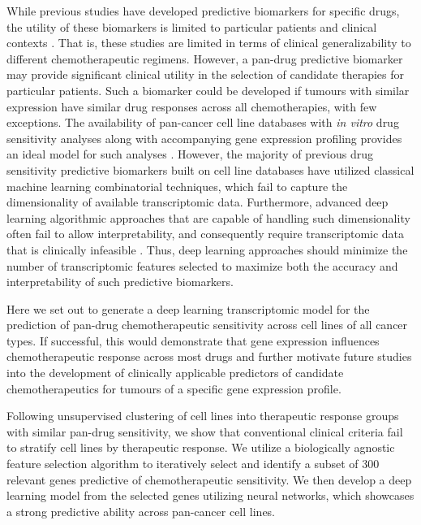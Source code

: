 \documentclass[10pt, letterpaper]{article}
\begin{document}
\begin{multicols*}{2}
While previous studies have developed predictive biomarkers for specific drugs, the utility of these biomarkers is limited to particular patients and clinical contexts \cite{drug_sense}. That is, these studies are limited in terms of clinical generalizability to different chemotherapeutic regimens. However, a pan-drug predictive biomarker may provide significant clinical utility in the selection of candidate therapies for particular patients. Such a biomarker could be developed if tumours with similar expression have similar drug responses across all chemotherapies, with few exceptions. The availability of pan-cancer cell line databases with \textit{in vitro} drug sensitivity analyses along with accompanying gene expression profiling provides an ideal model for such analyses \cite{gdsc}. However, the majority of previous drug sensitivity predictive biomarkers built on cell line databases have utilized classical machine learning combinatorial techniques, which fail to capture the dimensionality of available transcriptomic data. Furthermore, advanced deep learning algorithmic approaches that are capable of handling such dimensionality often fail to allow interpretability, and consequently require transcriptomic data that is clinically infeasible \cite{ml_oncol}. Thus, deep learning approaches should minimize the number of transcriptomic features selected to maximize both the accuracy and interpretability of such predictive biomarkers.

Here we set out to generate a deep learning transcriptomic model for the prediction of pan-drug chemotherapeutic sensitivity across cell lines of all cancer types. If successful, this would demonstrate that gene expression influences chemotherapeutic response across most drugs and further motivate future studies into the development of clinically applicable predictors of candidate chemotherapeutics for tumours of a specific gene expression profile.

Following unsupervised clustering of cell lines into therapeutic response groups with similar pan-drug sensitivity, we show that conventional clinical criteria fail to stratify cell lines by therapeutic response. We utilize a biologically agnostic feature selection algorithm to iteratively select and identify a subset of 300 relevant genes predictive of chemotherapeutic sensitivity. We then develop a deep learning model from the selected genes utilizing neural networks, which showcases a strong predictive ability across pan-cancer cell lines.



\end{multicols*}
\end{document}
